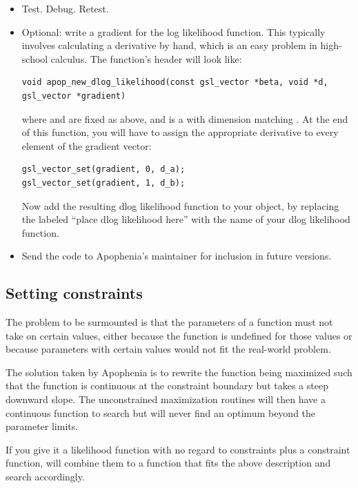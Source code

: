 \begin{itemize}
\item Test. Debug. Retest.

\item Optional: write a gradient for the log likelihood function. This
typically involves calculating a derivative by hand, which is an easy
problem in high-school calculus. The function's header will look like: 
\begin{lstlisting}
void apop_new_dlog_likelihood(const gsl_vector *beta, void *d, gsl_vector *gradient)
\end{lstlisting}
where  and  are fixed as above, and  is a  with dimension matching . 
At the end of this function, you will have to assign the appropriate derivative to every element of the gradient vector:
\begin{lstlisting}
gsl_vector_set(gradient, 0, d_a);
gsl_vector_set(gradient, 1, d_b);
\end{lstlisting}
Now add the resulting dlog likelihood function to your object, by
replacing the  labeled ``place dlog likelihood here'' with
the name of your dlog likelihood function.  
\item Send the code to Apophenia's maintainer for inclusion in future
versions.  \end{itemize}


\subsection{Setting
constraints}\label{constraintwriting}

The problem to be surmounted is that the parameters of a function must not take on
certain values, either because the function is undefined for those
values or because parameters with certain values would not fit the
real-world problem.

The solution taken by Apophenia is to rewrite the function being maximized such that the
function is continuous at the constraint boundary but takes a steep
downward slope. The unconstrained maximization routines will then have a 
continuous function to search but will never find an optimum 
beyond the parameter limits.

If you give it a likelihood function with no regard to constraints plus
a constraint function,  will combine
them to a function that fits the above description and search accordingly.

